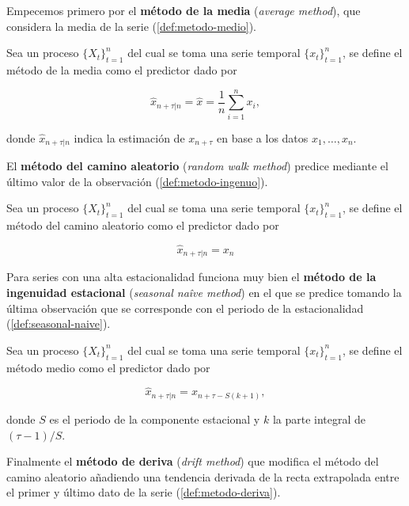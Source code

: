 Empecemos primero por el \textbf{método de la media} (\emph{average method}), que considera la media de la serie (\autoref{def:metodo-medio}).

\begin{definicion}
  Sea un proceso $\{X_t\}_{t = 1}^n$ del cual se toma una serie temporal $\{x_t\}_{t = 1}^n$, se define el método de la media como el predictor dado por

  $$\hat{x}_{n + \tau | n} = \hat{x} = \dfrac{1}{n}\sum \limits^n_{i = 1} x_i, $$

  donde $\hat{x}_{n + \tau | n}$ indica la estimación de $x_{n + \tau}$ en base a los datos $x_1, \ldots, x_n$.
  \label{def:metodo-medio}
\end{definicion}

El \textbf{método del camino aleatorio} (\emph{random walk method}) predice mediante el último valor de la observación (\autoref{def:metodo-ingenuo}).

\begin{definicion}
  Sea un proceso $\{X_t\}_{t = 1}^n$ del cual se toma una serie temporal $\{x_t\}_{t = 1}^n$, se define el método del camino aleatorio como el predictor dado por

  $$\hat{x}_{n + \tau | n} = x_n$$
  \label{def:metodo-ingenuo}
\end{definicion}

Para series con una alta estacionalidad funciona muy bien el \textbf{método de la ingenuidad estacional} (\emph{seasonal naîve method}) en el que se predice tomando la última observación que se corresponde con el periodo de la estacionalidad (\autoref{def:seasonal-naive}).

\begin{definicion}
  Sea un proceso $\{X_t\}_{t = 1}^n$ del cual se toma una serie temporal $\{x_t\}_{t = 1}^n$, se define el método medio como el predictor dado por

  $$\hat{x}_{n + \tau | n} = x_{n + \tau - S(k + 1)},$$

  donde $S$ es el periodo de la componente estacional y $k$ la parte integral de $(\tau - 1)/S$.
  \label{def:seasonal-naive}
\end{definicion}

Finalmente el \textbf{método de deriva} (\emph{drift method}) que modifica el método del camino aleatorio añadiendo una tendencia derivada de la recta extrapolada entre el primer y último dato de la serie (\autoref{def:metodo-deriva}).

